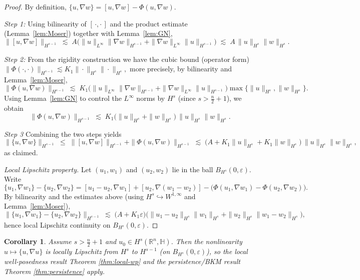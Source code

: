 \documentclass[10pt]{amsart}
\numberwithin{equation}{section}
\newtheorem{cor}[theorem]{Corollary}
\theoremstyle{remark}
\theoremstyle{definition}
\begin{document}
\begin{proof}
By definition, $\{u,\nabla w\}=[u,\nabla w]-\Phi(u,\nabla w)$.
\smallskip

\emph{Step 1:}
Using bilinearity of $[\,\cdot,\cdot\,]$ and the product estimate (Lemma~\ref{lem:Moser}) together with Lemma~\ref{lem:GN},
\[
\|[u,\nabla w]\|_{H^{s-1}}
\;\lesssim\;
A\big(\|u\|_{L^\infty}\|\nabla w\|_{H^{s-1}}+\|\nabla w\|_{L^\infty}\|u\|_{H^{s-1}}\big)
\;\lesssim\; A\, \|u\|_{H^{s}}\|w\|_{H^{s}}.
\]

\emph{Step 2: }
From the rigidity construction we have the cubic bound (operator form)
\(
\|\Phi(\cdot,\cdot)\|_{H^{s-1}}\lesssim K_1 \|\cdot\|_{H^{s}}\|\cdot\|_{H^{s}},
\)
more precisely, by bilinearity and Lemma~\ref{lem:Moser},
\[
\|\Phi(u,\nabla w)\|_{H^{s-1}}
\;\lesssim\;
K_1\Big(\|u\|_{L^\infty}\|\nabla w\|_{H^{s-1}}+\|\nabla w\|_{L^\infty}\|u\|_{H^{s-1}}\Big)\max\{\|u\|_{H^{s}},\|w\|_{H^{s}}\}.
\]
Using Lemma~\ref{lem:GN} to control the $L^\infty$ norms by $H^{s}$ (since $s>\frac{n}{2}+1$), we obtain
\[
\|\Phi(u,\nabla w)\|_{H^{s-1}}
\;\lesssim\;
K_1\big(\|u\|_{H^{s}}+\|w\|_{H^{s}}\big)\,\|u\|_{H^{s}}\|w\|_{H^{s}}.
\]

\emph{Step 3}
Combining the two steps yields
\[
\|\{u,\nabla w\}\|_{H^{s-1}}
\;\le\;
\|[u,\nabla w]\|_{H^{s-1}}+\|\Phi(u,\nabla w)\|_{H^{s-1}}
\;\lesssim\;
\big(A+K_1\|u\|_{H^{s}}+K_1\|w\|_{H^{s}}\big)\,\|u\|_{H^{s}}\|w\|_{H^{s}},
\]
as claimed.

\emph{Local Lipschitz property.}
Let $(u_1,w_1)$ and $(u_2,w_2)$ lie in the ball $B_{H^{s}}(0,\varepsilon)$.
Write
\[
\{u_1,\nabla w_1\}-\{u_2,\nabla w_2\}=[u_1-u_2,\nabla w_1]+[u_2,\nabla (w_1-w_2)]
-\big(\Phi(u_1,\nabla w_1)-\Phi(u_2,\nabla w_2)\big).
\]
By bilinearity and the estimates above (using $H^s\hookrightarrow W^{1,\infty}$ and Lemma~\ref{lem:Moser}),
\[
\|\{u_1,\nabla w_1\}-\{u_2,\nabla w_2\}\|_{H^{s-1}}
\;\lesssim\;
\big(A+K_1\varepsilon\big)\Big(\|u_1-u_2\|_{H^{s}}\|w_1\|_{H^{s}}+\|u_2\|_{H^{s}}\|w_1-w_2\|_{H^{s}}\Big),
\]
hence local Lipschitz continuity on $B_{H^{s}}(0,\varepsilon)$.
\end{proof}
\begin{cor}
\label{cor:threshold}
Assume $s>\frac{n}{2}+1$ and $u_0\in H^{s}(\mathbb{R}^n,\mathbb{H})$.
Then the nonlinearity $u\mapsto \{u,\nabla u\}$ is locally Lipschitz from $H^{s}$ to $H^{s-1}$
(on $B_{H^s}(0,\varepsilon)$), so the local well-posedness result \emph{Theorem \ref{thm:local-wp}}
and the persistence/BKM result \emph{Theorem \ref{thm:persistence}} apply.
\end{cor}
\end{document}
